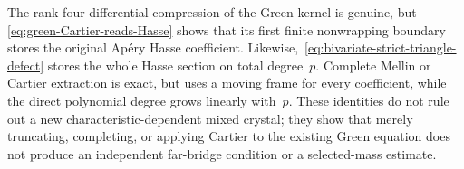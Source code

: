 \begin{remark}
\label{rem:green-Cartier-circularity}
The rank-four differential compression of the Green kernel is genuine, but
\eqref{eq:green-Cartier-reads-Hasse} shows that its first finite
nonwrapping boundary stores the original Ap\'ery Hasse coefficient.
Likewise,~\eqref{eq:bivariate-strict-triangle-defect} stores the whole Hasse
section on total degree~$p$.  Complete Mellin or Cartier extraction is
exact, but uses a moving frame for every coefficient, while the direct
polynomial degree grows linearly with~$p$.  These identities do not rule
out a new characteristic-dependent mixed crystal; they show that merely
truncating, completing, or applying Cartier to the existing Green equation
does not produce an independent far-bridge condition or a selected-mass
estimate.
\end{remark}
